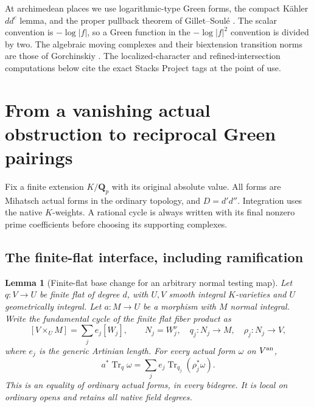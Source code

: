 \documentclass[11pt,a4paper]{article}
\newtheorem{lemma}[theorem]{Lemma}
\theoremstyle{definition}
\theoremstyle{remark}
\numberwithin{equation}{section}
\begin{document}
At archimedean places we use logarithmic-type Green forms, the compact K\"ahler $dd^c$ lemma, and the proper pullback theorem of Gillet--Soul\'e \cite[Sections 1.2--1.3 and Theorem 2.1.4(ii)]{GS}. The scalar convention is $-\log|f|$, so a Green function in the $-\log|f|^2$ convention is divided by two. The algebraic moving complexes and their biextension transition norms are those of Gorchinskiy \cite[Lemma 2.1, Section 4.1 and Proposition 4.2]{Gor}. The localized-character and refined-intersection computations below cite the exact Stacks Project tags at the point of use.



\section{From a vanishing actual obstruction to reciprocal Green pairings}
\label{r16h:section}

Fix a finite extension $K/\mathbf Q_p$ with its original absolute value.
All forms are Mihatsch actual forms in the ordinary topology, and
$D=d'd''$. Integration uses the native $K$-weights. A rational cycle is
always written with its final nonzero prime coefficients before choosing
its supporting complexes.

\subsection{The finite-flat interface, including ramification}

\begin{lemma}[Finite-flat base change for an arbitrary normal testing map]
\label{r16h:finite-base-change}
Let $q:V\to U$ be finite flat of degree $d$, with $U,V$ smooth integral
$K$-varieties and $U$ geometrically integral. Let $a:M\to U$ be a
morphism with $M$ normal integral. Write the fundamental cycle of the
finite flat fiber product as
\[
 [V\times_U M]=\sum_j e_j[W_j],
 \qquad N_j=W_j^\nu,\quad q_j:N_j\to M,\quad \rho_j:N_j\to V,
\]
where $e_j$ is the generic Artinian length. For every actual form $\omega$
on $V^{\rm an}$,
\[
 a^*\operatorname{Tr}_q\omega
   =\sum_j e_j\operatorname{Tr}_{q_j}(\rho_j^*\omega).
 \tag{H16.1}\label{r16h:base-change}
\]
This is an equality of ordinary actual forms, in every bidegree. It is
local on ordinary opens and retains all native field degrees.
\end{lemma}
\end{document}
